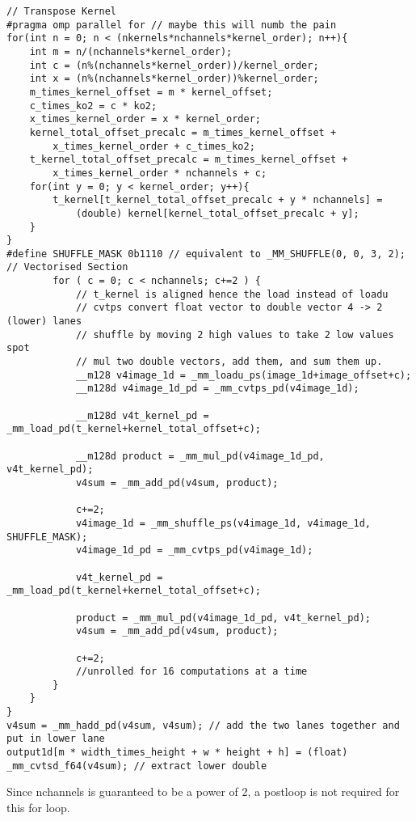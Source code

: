 \documentclass[12pt,fleqn,leqno,letterpaper]{article}
\begin{document}
\begin{verbatim}
// Transpose Kernel
#pragma omp parallel for // maybe this will numb the pain
for(int n = 0; n < (nkernels*nchannels*kernel_order); n++){
    int m = n/(nchannels*kernel_order);
    int c = (n%(nchannels*kernel_order))/kernel_order; 
    int x = (n%(nchannels*kernel_order))%kernel_order; 
    m_times_kernel_offset = m * kernel_offset;
    c_times_ko2 = c * ko2;
    x_times_kernel_order = x * kernel_order;
    kernel_total_offset_precalc = m_times_kernel_offset + 
        x_times_kernel_order + c_times_ko2;
    t_kernel_total_offset_precalc = m_times_kernel_offset + 
        x_times_kernel_order * nchannels + c;
    for(int y = 0; y < kernel_order; y++){
        t_kernel[t_kernel_total_offset_precalc + y * nchannels] = 
            (double) kernel[kernel_total_offset_precalc + y];
    }
}
#define SHUFFLE_MASK 0b1110 // equivalent to _MM_SHUFFLE(0, 0, 3, 2);
// Vectorised Section
        for ( c = 0; c < nchannels; c+=2 ) {
            // t_kernel is aligned hence the load instead of loadu
            // cvtps convert float vector to double vector 4 -> 2 (lower) lanes
            // shuffle by moving 2 high values to take 2 low values spot
            // mul two double vectors, add them, and sum them up.
            __m128 v4image_1d = _mm_loadu_ps(image_1d+image_offset+c);
            __m128d v4image_1d_pd = _mm_cvtps_pd(v4image_1d);

            __m128d v4t_kernel_pd = _mm_load_pd(t_kernel+kernel_total_offset+c);

            __m128d product = _mm_mul_pd(v4image_1d_pd, v4t_kernel_pd);
            v4sum = _mm_add_pd(v4sum, product);

            c+=2;
            v4image_1d = _mm_shuffle_ps(v4image_1d, v4image_1d, SHUFFLE_MASK);
            v4image_1d_pd = _mm_cvtps_pd(v4image_1d);

            v4t_kernel_pd = _mm_load_pd(t_kernel+kernel_total_offset+c);

            product = _mm_mul_pd(v4image_1d_pd, v4t_kernel_pd);
            v4sum = _mm_add_pd(v4sum, product);

            c+=2;
            //unrolled for 16 computations at a time 
        }
    }
}
v4sum = _mm_hadd_pd(v4sum, v4sum); // add the two lanes together and put in lower lane
output1d[m * width_times_height + w * height + h] = (float) _mm_cvtsd_f64(v4sum); // extract lower double 
\end{verbatim}
Since nchannels is guaranteed to be a power of 2, a postloop is not required for this for loop.
\end{document}
